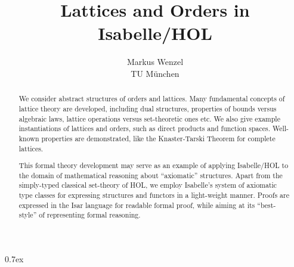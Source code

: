\documentclass[11pt,a4paper]{article}
\begin{document}
\title{Lattices and Orders in Isabelle/HOL}
\author{Markus Wenzel \\ TU M\"unchen}
\maketitle

\begin{abstract}
  We consider abstract structures of orders and lattices.  Many fundamental
  concepts of lattice theory are developed, including dual structures,
  properties of bounds versus algebraic laws, lattice operations versus
  set-theoretic ones etc.  We also give example instantiations of lattices and
  orders, such as direct products and function spaces.  Well-known properties
  are demonstrated, like the Knaster-Tarski Theorem for complete lattices.
  
  This formal theory development may serve as an example of applying
  Isabelle/HOL to the domain of mathematical reasoning about ``axiomatic''
  structures.  Apart from the simply-typed classical set-theory of HOL, we
  employ Isabelle's system of axiomatic type classes for expressing structures
  and functors in a light-weight manner.  Proofs are expressed in the Isar
  language for readable formal proof, while aiming at its ``best-style'' of
  representing formal reasoning.
\end{abstract}

\tableofcontents

\newpage
{
  \parindent 0pt\parskip 0.7ex
  \pagestyle{myheadings}
  \renewcommand{\isamarkupheader}[1]{\markright{THEORY~``\isabellecontext''}\section{#1}}
  
}

\nocite{Wenzel:1999:TPHOL}
\nocite{Wenzel:2000:isar-ref}
\nocite{Wenzel:2000:axclass}
\nocite{Bauer-Wenzel:2000:HB}



\end{document}
